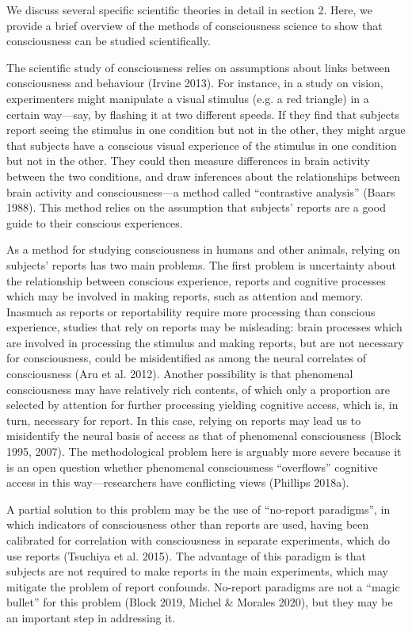 \documentclass[12pt]{article}
\begin{document}
We discuss several specific scientific theories in detail in section 2. Here, we provide a brief overview of the methods of consciousness science to show that consciousness can be studied scientifically.

The scientific study of consciousness relies on assumptions about links between consciousness and behaviour (Irvine 2013). For instance, in a study on vision, experimenters might manipulate a visual stimulus (e.g. a red triangle) in a certain way—say, by flashing it at two different speeds. If they find that subjects report seeing the stimulus in one condition but not in the other, they might argue that subjects have a conscious visual experience of the stimulus in one condition but not in the other. They could then measure differences in brain activity between the two conditions, and draw inferences about the relationships between brain activity and consciousness—a method called ``contrastive analysis'' (Baars 1988). This method relies on the assumption that subjects’ reports are a good guide to their conscious experiences.

As a method for studying consciousness in humans and other animals, relying on subjects’ reports has two main problems. The first problem is uncertainty about the relationship between conscious experience, reports and cognitive processes which may be involved in making reports, such as attention and memory. Inasmuch as reports or reportability require more processing than conscious experience, studies that rely on reports may be misleading: brain processes which are involved in processing the stimulus and making reports, but are not necessary for consciousness, could be misidentified as among the neural correlates of consciousness (Aru et al. 2012). Another possibility is that phenomenal consciousness may have relatively rich contents, of which only a proportion are selected by attention for further processing yielding cognitive access, which is, in turn, necessary for report. In this case, relying on reports may lead us to misidentify the neural basis of access as that of phenomenal consciousness (Block 1995, 2007). The methodological problem here is arguably more severe because it is an open question whether phenomenal consciousness ``overflows'' cognitive access in this way—researchers have conflicting views (Phillips 2018a).

A partial solution to this problem may be the use of ``no-report paradigms'', in which indicators of consciousness other than reports are used, having been calibrated for correlation with consciousness in separate experiments, which do use reports (Tsuchiya et al. 2015). The advantage of this paradigm is that subjects are not required to make reports in the main experiments, which may mitigate the problem of report confounds. No-report paradigms are not a ``magic bullet'' for this problem (Block 2019, Michel \& Morales 2020), but they may be an important step in addressing it.
\end{document}
